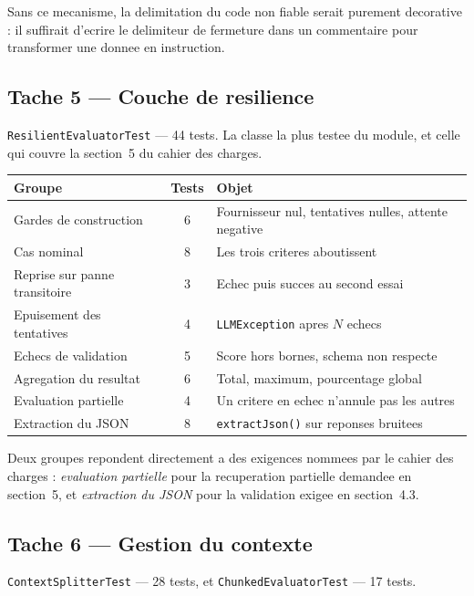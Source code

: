 \documentclass[12pt,a4paper]{article}
\begin{document}
Sans ce mecanisme, la delimitation du code non fiable serait purement decorative :
il suffirait d'ecrire le delimiteur de fermeture dans un commentaire pour
transformer une donnee en instruction.

\subsection{Tache 5 --- Couche de resilience}

\texttt{ResilientEvaluatorTest} --- 44 tests. La classe la plus testee du module,
et celle qui couvre la section~5 du cahier des charges.

\begin{center}
\begin{tabular}{lcl}
\toprule
\textbf{Groupe} & \textbf{Tests} & \textbf{Objet} \\
\midrule
Gardes de construction & 6 & Fournisseur nul, tentatives nulles, attente negative \\
Cas nominal & 8 & Les trois criteres aboutissent \\
Reprise sur panne transitoire & 3 & Echec puis succes au second essai \\
Epuisement des tentatives & 4 & \texttt{LLMException} apres $N$ echecs \\
Echecs de validation & 5 & Score hors bornes, schema non respecte \\
Agregation du resultat & 6 & Total, maximum, pourcentage global \\
Evaluation partielle & 4 & Un critere en echec n'annule pas les autres \\
Extraction du JSON & 8 & \texttt{extractJson()} sur reponses bruitees \\
\bottomrule
\end{tabular}
\end{center}

Deux groupes repondent directement a des exigences nommees par le cahier des
charges : \emph{evaluation partielle} pour la recuperation partielle demandee en
section~5, et \emph{extraction du JSON} pour la validation exigee en section~4.3.

\subsection{Tache 6 --- Gestion du contexte}

\texttt{ContextSplitterTest} --- 28 tests, et \texttt{ChunkedEvaluatorTest} ---
17 tests.
\end{document}
